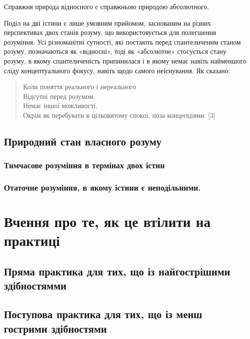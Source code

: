 \documentclass{article}
\begin{document}
Справжня природа відносного є справжньою природою абсолютного.

Поділ на дві істини є лише умовним прийомом, заснованим на різних перспективах двох станів розуму, що використовується для полегшення розуміння. Усі різноманітні сутності, які постають перед спантеличеним станом розуму, позначаються як «відносні», тоді як «абсолютне» стосується стану розуму, в якому спантеличеність припинилася і в якому немає навіть найменшого сліду концептуального фокусу, навіть щодо самого неіснування. Як сказано:

\begin{verse}
        Коли поняття реального і нереального \\
        Відсутні перед розумом, \\
        Немає іншої можливості, \\
        Окрім як перебувати в цілковитому спокої, поза концепціями. [3] \\
\end{verse}

\subsection{Природний стан власного розуму}

\subsubsection{Тимчасове розуміння в термінах двох істин}

\subsubsection{Отаточне розуміння, в якому істини є неподільними.}

\section{Вчення про те, як це втілити на практиці}

\subsection{Пряма практика для тих, що із найгострішими здібностямми}

\subsection{Поступова практика для тих, що із менш гострими здібностями}
\end{document}
